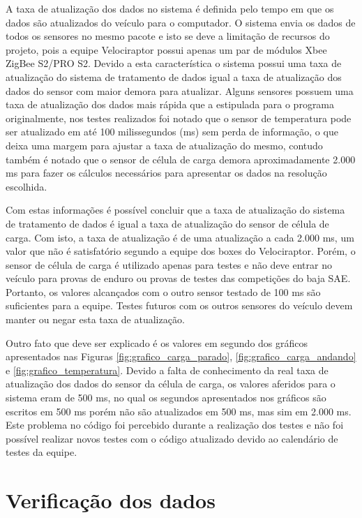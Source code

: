 A taxa de atualização dos dados no sistema é definida pelo tempo em que os dados são atualizados do veículo para o computador. O sistema envia os dados de todos os sensores no mesmo pacote e isto se deve a limitação de recursos do projeto, pois a equipe Velociraptor possui apenas um par de módulos Xbee ZigBee S2/PRO S2. Devido a esta característica o sistema possui uma taxa de atualização do sistema de tratamento de dados igual a taxa de atualização dos dados do sensor com maior demora para atualizar. Alguns sensores possuem uma taxa de atualização dos dados mais rápida que a estipulada para o programa originalmente, nos testes realizados foi notado que o sensor de temperatura pode ser atualizado em até 100 milissegundos (ms) sem perda de informação, o que deixa uma margem para ajustar a taxa de atualização do mesmo, contudo também é notado que o sensor de célula de carga demora aproximadamente 2.000 ms para fazer os cálculos necessários para apresentar os dados na resolução escolhida.

Com estas informações é possível concluir que a taxa de atualização do sistema de tratamento de dados é igual a taxa de atualização do sensor de célula de carga. Com isto, a taxa de atualização é de uma atualização a cada 2.000 ms, um valor que não é satisfatório segundo a equipe dos boxes do Velociraptor. Porém, o sensor de célula de carga é utilizado apenas para testes e não deve entrar no veículo para provas de enduro ou provas de testes das competições do baja SAE. Portanto, os valores alcançados com o outro sensor testado de 100 ms são suficientes para a equipe. Testes futuros com os outros sensores do veículo devem manter ou negar esta taxa de atualização.

Outro fato que deve ser explicado é os valores em segundo dos gráficos apresentados nas Figuras \ref{fig:grafico_carga_parado}, \ref{fig:grafico_carga_andando} e \ref{fig:grafico_temperatura}. Devido a falta de conhecimento da real taxa de atualização dos dados do sensor da célula de carga, os valores aferidos para o sistema eram de 500 ms, no qual os segundos apresentados nos gráficos são escritos em 500 ms porém não são atualizados em 500 ms, mas sim em 2.000 ms. Este problema no código foi percebido durante a realização dos testes e não foi possível realizar novos testes com o código atualizado devido ao calendário de testes da equipe.

\section{Verificação dos dados}
\label{sec:validacao}

